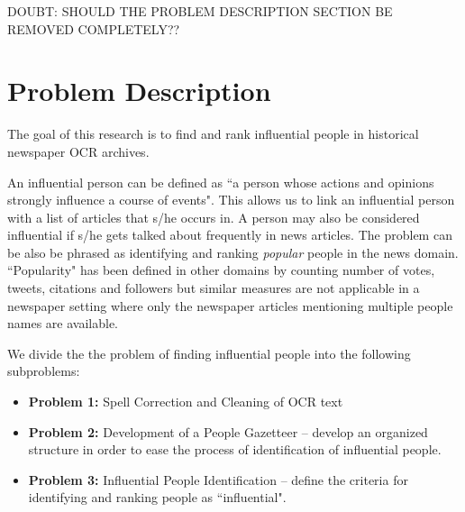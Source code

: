 \documentclass[10pt,journal,compsoc]{IEEEtran}
\begin{document}
DOUBT: SHOULD THE PROBLEM DESCRIPTION SECTION BE REMOVED COMPLETELY??
\section{Problem Description}
\label{problem}

The goal of this research is to find and rank influential people in historical newspaper OCR archives.
  
 An influential person can be defined as ``a person whose actions and opinions strongly influence a course of events". This allows us to link an influential person with a list of articles that s/he occurs in.
 A person may also be considered influential if s/he gets talked about frequently in news articles. The problem can be also be phrased as identifying and ranking \emph{popular} people in the news domain. 
 ``Popularity" has been defined in other domains by counting number of votes, tweets, citations and followers \cite{cheng2014can} but similar measures are not applicable in a newspaper setting where only the newspaper articles mentioning multiple people names are available.  
 
We divide the the problem of finding influential people into the following subproblems:
\begin{itemize}
\item \textbf{Problem 1: } Spell Correction and Cleaning of OCR text
\item \textbf{Problem 2: } Development of a People Gazetteer -- develop an organized structure in order to ease the process of identification of influential people.
\item \textbf{Problem 3: } Influential People Identification -- define the criteria for identifying and ranking people as ``influential".
\end{itemize}
\end{document}
